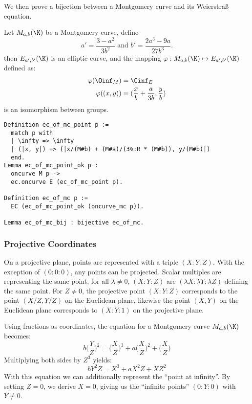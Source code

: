 We then prove a bijection between a Montgomery curve and its Weierstra{\ss} equation.
\begin{lemma}
  Let $M_{a,b}(\K)$ be a Montgomery curve, define
  $$a' = \frac{3-a^2}{3b^2} \text{\ \ \ \ and\ \ \ \ } b' = \frac{2a^3 - 9a}{27b^3}.$$
  then $E_{a',b'}(\K)$ is an elliptic curve, and the mapping
  $\varphi : M_{a,b}(\K) \mapsto E_{a',b'}(\K)$ defined as:
  \begin{align*}
    \varphi(\Oinf_M) &= \Oinf_E\\
    \varphi( (x , y) ) &= ( \frac{x}{b} + \frac{a}{3b} , \frac{y}{b} )
  \end{align*}
  is an isomorphism between groups.
\end{lemma}
\begin{lstlisting}[language=Coq]
Definition ec_of_mc_point p :=
  match p with
  | \infty => \infty
  | (|x, y|) => (|x/(M#b) + (M#a)/(3%:R * (M#b)), y/(M#b)|)
  end.
Lemma ec_of_mc_point_ok p :
  oncurve M p ->
  ec.oncurve E (ec_of_mc_point p).

Definition ec_of_mc p :=
  EC (ec_of_mc_point_ok (oncurve_mc p)).

Lemma ec_of_mc_bij : bijective ec_of_mc.
\end{lstlisting}

\subsubsection{Projective Coordinates}
\label{subsec:ECC-projective}

On a projective plane, points are represented with a triple $(X:Y:Z)$.
With the exception of $(0:0:0)$, any points can be projected.
Scalar multiples are representing the same point, \ie
for all $\lambda \neq 0$, $(X:Y:Z)$ are $(\lambda X:\lambda Y:\lambda Z)$ defining
the same point.
For $Z\neq 0$, the projective point $(X:Y:Z)$ corresponds to the
point $(X/Z,Y/Z)$ on the Euclidean plane, likewise the point $(X,Y)$ on the
Euclidean plane corresponds to $(X:Y:1)$ on the projective plane.

Using fractions as coordinates, the equation for a Montgomery curve $M_{a,b}(\K)$
becomes:
$$b \bigg(\frac{Y}{Z}\bigg)^2 = \bigg(\frac{X}{Z}\bigg)^3 + a \bigg(\frac{X}{Z}\bigg)^2 + \bigg(\frac{X}{Z}\bigg)$$
Multiplying both sides by $Z^3$ yields:
$$b Y^2Z = X^3 + a X^2Z + XZ^2$$
With this equation we can additionally represent the ``point at infinity''. By
setting $Z=0$, we derive $X=0$, giving us the ``infinite points'' $(0:Y:0)$ with $Y\neq 0$.

